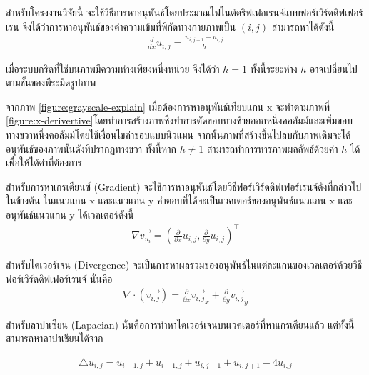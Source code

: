 \hspace{1cm} สำหรับโครงงานวิจัยนี้ จะใช้วิธีการหาอนุพันธ์โดยประมาณไฟไนต์ดริฟเฟอเรนจ์แบบฟอร์เวิร์ดดิฟเฟอร์เรน จึงได้ว่าการหาอนุพันธ์ของค่าความเข้มที่พิกัดทางกายภาพเป็น $(i,j)$ สามารถหาได้ดังนี้
\begin{align*}
	\frac{d}{dx} u_{i,j} = \frac{u_{i,j+1} - u_{i,j}}{h}
\end{align*}

เมื่อระบบกริดที่ใช้บนภาพมีความห่างเพียงหนึ่งหน่วย จึงได้ว่า $h=1$ ทั้งนี้ระยะห่าง $h$ อาจเปลี่ยนไปตามชั้นของพีระมิดรูปภาพ



\hspace{1cm} จากภาพ \ref{figure:grayscale-explain} เมื่อต้องการหาอนุพันธ์เทียบแกน x จะทำตามภาพที่ \ref{figure:x-derivertive}โดยทำการสร้างภาพซึ่งทำการตัดขอบทางซ้ายออกหนึ่งคอลัมม์และเพิ่มขอบทางขวาหนึ่งคอลัมม์โดยใช้เงื่อนไขค่าขอบแบบนิวแมน จากนั้นภาพที่สร้างขึ้นไปลบกับภาพเดิมจะได้อนุพันธ์ของภาพนั้นดังที่ปรากฏทางขวา ทั้งนี้หาก $ h \neq 1 $ สามารถทำการหารภาพผลลัพธ์ด้วยค่า $h$ ได้เพื่อให้ได้ค่าที่ต้องการ

\noindent\hspace{1cm}สำหรับการหาเกรเดียนซ์ (Gradient) จะใช้การหาอนุพันธ์โดยวิธีฟอร์เวิร์ดดิฟเฟอร์เรนจ์ดังที่กล่าวไปในข้างต้น ในแนวแกน x และแนวแกน y คำตอบที่ได้จะเป็นเวคเตอร์ของอนุพันธ์แนวแกน x และอนุพันธ์แนวแกน y  ได้เวคเตอร์ดังนี้ 
\begin{align*}
	\nabla \vec{v_{u_i}} = (\frac{\partial }{\partial x} u_{i,j},\frac{\partial}{\partial y} u_{i,j})^{\top}	
\end{align*}

\noindent\hspace{1cm}สำหรับไดเวอร์เจน (Divergence) จะเป็นการหาผลรวมของอนุพันธ์ในแต่ละแกนของเวคเตอร์ด้วยวิธีฟอร์เวิร์ดดิฟเฟอร์เรนจ์ นั่นคือ 
\begin{align*} 
	\nabla \cdot (\vec{v_{i,j}}) = \frac{\partial}{\partial x}\vec{v_{i,j}}_x + \frac{\partial}{\partial y}\vec{v_{i,j}}_y
\end{align*}

\noindent\hspace{1cm}สำหรับลาปาเซียน (Lapacian) นั่นคือการทำหาไดเวอร์เจนบนเวคเตอร์ที่หาแกรเดียนแล้ว แต่ทั้งนี้สามารถหาลาปาเชียนได้จาก

\begin{align*}
	\triangle u_{i,j} = u_{i-1,j} + u_{i+1,j} + u_{i,j-1} + u_{i,j+1} - 4 u_{i,j} 
\end{align*}




